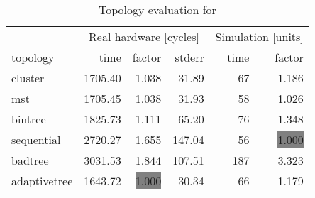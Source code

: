 \begin{table}[htb]
  \centering
  \begin{tabular}{lrrrrr}
  \toprule
  & \multicolumn{3}{c}{Real hardware [cycles]} & \multicolumn{2}{c}{Simulation [units]} \\
  topology & time & factor & stderr & time & factor \\
  \midrule
  cluster & 1705.40 & 1.038 & 31.89 & 67 & 1.186 \\
  mst & 1705.45 & 1.038 & 31.93 & 58 & 1.026 \\
  bintree & 1825.73 & 1.111 & 65.20 & 76 & 1.348 \\
  sequential & 2720.27 & 1.655 & 147.04 & 56 & \colorbox{gray}{1.000} \\
  badtree & 3031.53 & 1.844 & 107.51 & 187 & 3.323 \\
  adaptivetree & 1643.72 & \colorbox{gray}{1.000} & 30.34 & 66 & 1.179 \\
  \midrule
  \end{tabular}
  \caption{Topology evaluation for \tomme}
  \label{tab:tomme}
\end{table}
